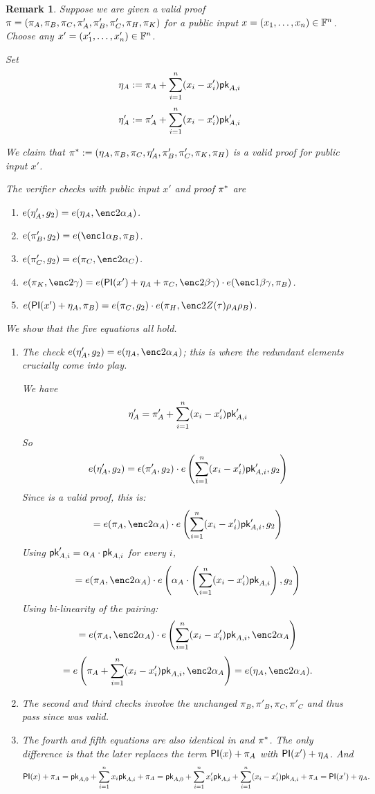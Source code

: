 \documentclass[11pt]{article}
\numberwithin{figure}{section} %
\newtheorem{remark}[thm]{Remark}
\newcommand{\eps}{\epsilon}
\newcommand{\e}{\eps}
\begin{document}
\begin{remark}
 
 Suppose we are given a valid proof $\pi = (\pi_A,\pi_B,\pi_C,\pi'_A,\pi'_B,\pi'_C,\pi_H,\pi_K)$
 for a public input $x=(x_1,\ldots,x_n)\in \mathbb F^{n}$.
 Choose any $x'=(x'_1,\ldots,x'_n)\in \mathbb F^n$.

 Set 
 \[\eta_A:= \pi_A + \sum_{i=1}^n (x_i-x'_i)\mathsf{pk}_{A,i}\]
 \[\eta'_A:= \pi'_A + \sum_{i=1}^n (x_i-x'_i) \mathsf{pk}'_{A,i}\]
 
 We claim that $\pi^* := (\eta_A,\pi_B,\pi_C,\eta'_A,\pi'_B,\pi'_C,\pi_K,\pi_H)$ is a valid proof for
 public input $x'$.
 
 The verifier checks with public input $x'$ and proof $\pi^*$ are
\begin{enumerate}
 \item $e(\eta'_A,g_2)=e(\eta_A,\enc2{\alpha_A})$.
\item $e(\pi'_B, g_2)=e(\enc1{\alpha_B},\pi_B)$.
\item $e(\pi'_C,g_2)=e(\pi_C,\enc2{\alpha_C})$.
\item $e(\pi_K,\enc2{\gamma})=e(\PI(x')+\eta_A+\pi_C,\enc2{\beta\gamma})\cdot e(\enc1{\beta\gamma},\pi_B)$.
\item $e(\PI(x')+\eta_A,\pi_B)= e(\pi_C,g_2)\cdot e(\pi_H,\enc2{Z(\tau)\rho_A\rho_B})$.
 \end{enumerate}
 
 
 We show that the five equations all hold.
 \begin{enumerate}
  \item The check  $e(\eta'_A,g_2)=e(\eta_A,\enc2{\alpha_A})$;
  this is where the redundant elements crucially come into play.
  
  
  We have
  \[\eta'_A = \pi'_A + \sum_{i=1}^n (x_i-x'_i) \mathsf{pk}'_{A,i}\]
 So
 \[e(\eta'_A,g_2) = \e(\pi'_A,g_2)\cdot e\left(\sum_{i=1}^n (x_i-x'_i) \pk'_{A,i},g_2\right)\]
 Since \prf is a valid proof, this is:
  \[=e(\pi_A,\enc2{\alpha_A})\cdot e\left(\sum_{i=1}^n (x_i-x'_i) \pk'_{A,i},g_2\right)\]
  Using $\mathsf{pk}'_{A,i} = \alpha_A\cdot \mathsf{pk}_{A,i}$ for every $i$,
  \[=e(\pi_A,\enc2{\alpha_A})\cdot e\left(\alpha_A\cdot \left(\sum_{i=1}^n (x_i-x'_i) \pk_{A,i}\right),g_2\right)\]
Using bi-linearity of the pairing:
 \[=e(\pi_A,\enc2{\alpha_A})\cdot e\left(\sum_{i=1}^n (x_i-x'_i) \pk_{A,i},\enc2{\alpha_A}\right)\]
  \[=e\left(\pi_A+\sum_{i=1}^n (x_i-x'_i) \pk_{A,i},\enc2{\alpha_A}\right) = e(\eta_A,\enc2{\alpha_A}).\]
  \item The second and third checks involve the unchanged $\pi_B,\pi'_B,\pi_C,\pi'_C$
  and thus pass since \prf was valid.
  \item The fourth and fifth equations are also identical in \prf and $\pi^*$.
  The only difference is that the later replaces the term $\mathsf{PI}(x) + \pi_A$ 
  with $\mathsf{PI}(x')+ \eta_A$. And 
    \[\mathsf{PI}(x) + \pi_A = \mathsf{pk}_{A,0} + \sum_{i=1}^n x_i\mathsf{pk}_{A,i} + \pi_A = 
  \mathsf{pk}_{A,0} + \sum_{i=1}^n x'_i\mathsf{pk}_{A,i} +  \sum_{i=1}^n (x_i-x'_i) \mathsf{pk}_{A,i}  + \pi_A =
  \mathsf{PI}(x') + \eta_A.
  \]


\end{enumerate}
\end{remark}
\end{document}
